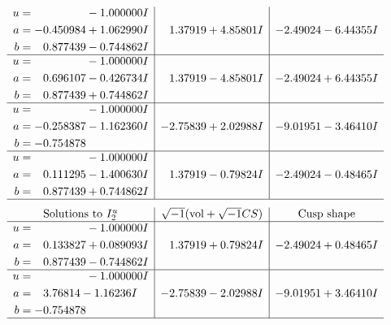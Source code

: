 \documentclass[1p]{elsarticle_modified}
\theoremstyle{definition}
\newcommand{\I}{\sqrt{-1}}
\begin{document}
$$\begin{array}{c|c|c}
\begin{aligned}
u &= \phantom{-0.000000 } -1.000000 I \\
a &= -0.450984 + 1.062990 I \\
b &= \phantom{-}0.877439 - 0.744862 I\end{aligned}
 & \phantom{-}1.37919 + 4.85801 I & -2.49024 - 6.44355 I \\ \hline\begin{aligned}
u &= \phantom{-0.000000 } -1.000000 I \\
a &= \phantom{-}0.696107 - 0.426734 I \\
b &= \phantom{-}0.877439 + 0.744862 I\end{aligned}
 & \phantom{-}1.37919 - 4.85801 I & -2.49024 + 6.44355 I \\ \hline\begin{aligned}
u &= \phantom{-0.000000 } -1.000000 I \\
a &= -0.258387 - 1.162360 I \\
b &= -0.754878\phantom{ +0.000000I}\end{aligned}
 & -2.75839 + 2.02988 I & -9.01951 - 3.46410 I \\ \hline\begin{aligned}
u &= \phantom{-0.000000 } -1.000000 I \\
a &= \phantom{-}0.111295 - 1.400630 I \\
b &= \phantom{-}0.877439 + 0.744862 I\end{aligned}
 & \phantom{-}1.37919 - 0.79824 I & -2.49024 - 0.48465 I\\
 \hline 
 \end{array}$$\newpage$$\begin{array}{c|c|c}  
\text{Solutions to }I^u_{2}& \I (\text{vol} + \sqrt{-1}CS) & \text{Cusp shape}\\
 \hline 
\begin{aligned}
u &= \phantom{-0.000000 } -1.000000 I \\
a &= \phantom{-}0.133827 + 0.089093 I \\
b &= \phantom{-}0.877439 - 0.744862 I\end{aligned}
 & \phantom{-}1.37919 + 0.79824 I & -2.49024 + 0.48465 I \\ \hline\begin{aligned}
u &= \phantom{-0.000000 } -1.000000 I \\
a &= \phantom{-}3.76814 - 1.16236 I \\
b &= -0.754878\phantom{ +0.000000I}\end{aligned}
 & -2.75839 - 2.02988 I & -9.01951 + 3.46410 I\\
 \hline 
 \end{array}$$\newpage
\end{document}
